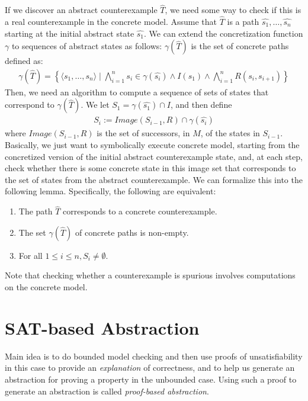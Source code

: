 \documentclass[10pt,a4paper]{article}
\begin{document}
If we discover an abstract counterexample $\widehat{T}$, we need some way to check if this is a real counterexample in the concrete model. Assume that $\widehat{T}$ is a path $\widehat{s_1},\dots, \widehat{s_n}$ starting at the initial abstract state $\widehat{s_1}$. We can extend the concretization function $\gamma$ to sequences of abstract states as follows: $\gamma(\widehat{T})$ is the set of concrete paths defined as:
\begin{align*}
    \gamma(\widehat{T}) = \left\lbrace \langle s_1,\dots,s_n \rangle \mid 
    \bigwedge_{i=1}^n s_i \in \gamma(\widehat{s_i}) \wedge I(s_1) \wedge 
    \bigwedge_{i=1}^n R(s_i,s_{i+1})
    \right\rbrace
\end{align*}
Then, we need an algorithm to compute a sequence of sets of states that correspond to $\gamma({\widehat{T}})$. We let $S_1 = \gamma(\widehat{s_1}) \cap I$, and then define 
\begin{align*}
    S_i := Image(S_{i-1}, R) \cap \gamma(\widehat{s_i})
\end{align*}
where $Image(S_{i-1}, R)$ is the set of successors, in $M$, of the states in $S_{i-1}$. Basically, we just want to symbolically execute concrete model, starting from the concretized version of the initial abstract counterexample state, and, at each step, check whether there is some concrete state in this image set that corresponds to the set of states from the abstract counterexample. We can formalize this into the following lemma. Specifically, the following are equivalent:
\begin{enumerate}
    \item The path $\widehat{T}$ corresponds to a concrete counterexample.
    \item The set $\gamma(\widehat{T})$ of concrete paths is non-empty.
    \item For all $1 \leq i \leq n, S_i \neq \emptyset$.
\end{enumerate}

Note that checking whether a counterexample is spurious involves computations on the concrete model.


\section*{SAT-based Abstraction}

Main idea is to do bounded model checking and then use proofs of unsatisfiability in this case to provide an \textit{explanation} of correctness, and to help us generate an abstraction for proving a property in the unbounded case. Using such a proof to generate an abstraction is called \textit{proof-based abstraction}\cite{2003abswithoutcex}.




\end{document}
